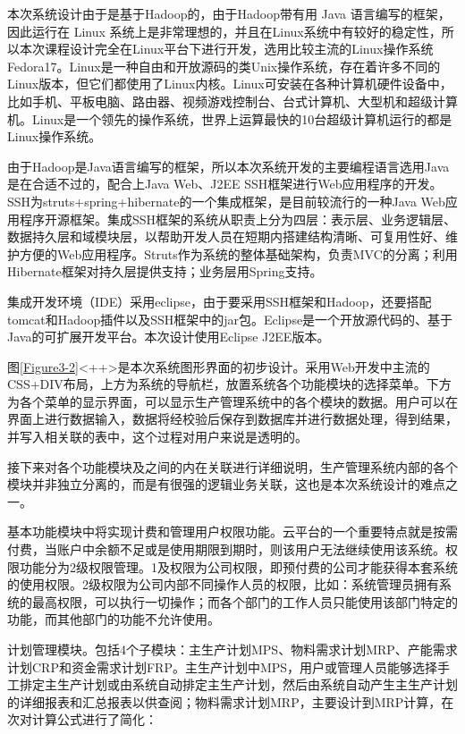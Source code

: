 \documentclass{Proposal}
\begin{document}

本次系统设计由于是基于Hadoop的，由于Hadoop带有用 Java 语言编写的框架，因此运行在 Linux 系统上是非常理想的，并且在Linux系统中有较好的稳定性，所以本次课程设计完全在Linux平台下进行开发，选用比较主流的Linux操作系统Fedora17。Linux是一种自由和开放源码的类Unix操作系统，存在着许多不同的Linux版本，但它们都使用了Linux内核。Linux可安装在各种计算机硬件设备中，比如手机、平板电脑、路由器、视频游戏控制台、台式计算机、大型机和超级计算机。Linux是一个领先的操作系统，世界上运算最快的10台超级计算机运行的都是Linux操作系统。

由于Hadoop是Java语言编写的框架，所以本次系统开发的主要编程语言选用Java是在合适不过的，配合上Java Web、J2EE SSH框架进行Web应用程序的开发。SSH为struts+spring+hibernate的一个集成框架，是目前较流行的一种Java Web应用程序开源框架。集成SSH框架的系统从职责上分为四层：表示层、业务逻辑层、数据持久层和域模块层，以帮助开发人员在短期内搭建结构清晰、可复用性好、维护方便的Web应用程序。Struts作为系统的整体基础架构，负责MVC的分离；利用Hibernate框架对持久层提供支持；业务层用Spring支持。

集成开发环境（IDE）采用eclipse，由于要采用SSH框架和Hadoop，还要搭配tomcat和Hadoop插件以及SSH框架中的jar包。Eclipse是一个开放源代码的、基于Java的可扩展开发平台。本次设计使用Eclipse J2EE版本。

图\ref{Figure3-2}<++>是本次系统图形界面的初步设计。采用Web开发中主流的CSS+DIV布局，上方为系统的导航栏，放置系统各个功能模块的选择菜单。下方为各个菜单的显示界面，可以显示生产管理系统中的各个模块的数据。用户可以在界面上进行数据输入，数据将经校验后保存到数据库并进行数据处理，得到结果，并写入相关联的表中，这个过程对用户来说是透明的。


接下来对各个功能模块及之间的内在关联进行详细说明，生产管理系统内部的各个模块并非独立分离的，而是有很强的逻辑业务关联，这也是本次系统设计的难点之一。

基本功能模块中将实现计费和管理用户权限功能。云平台的一个重要特点就是按需付费，当账户中余额不足或是使用期限到期时，则该用户无法继续使用该系统。权限功能分为2级权限管理。1及权限为公司权限，即预付费的公司才能获得本套系统的使用权限。2级权限为公司内部不同操作人员的权限，比如：系统管理员拥有系统的最高权限，可以执行一切操作；而各个部门的工作人员只能使用该部门特定的功能，而其他部门的功能不允许使用。

计划管理模块。包括4个子模块：主生产计划MPS、物料需求计划MRP、产能需求计划CRP和资金需求计划FRP。主生产计划中MPS，用户或管理人员能够选择手工排定主生产计划或由系统自动排定主生产计划，然后由系统自动产生主生产计划的详细报表和汇总报表以供查阅；物料需求计划MRP，主要设计到MRP计算，在次对计算公式进行了简化：
\end{document}
